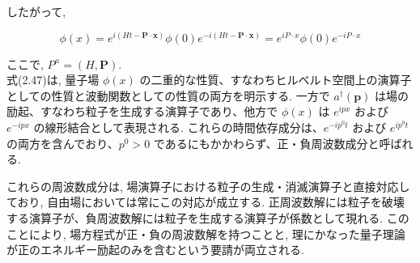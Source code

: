 \documentclass[a4paper,12pt]{article}
\begin{document}
したがって,

\begin{equation*}
\phi(x) = e^{i(Ht - \mathbf{P} \cdot \mathbf{x})} \phi(0) e^{-i(Ht - \mathbf{P} \cdot \mathbf{x})} = e^{i P \cdot x} \phi(0) e^{-i P \cdot x} \tag{2.49}
\end{equation*}

ここで, $P^\mu = (H, \mathbf{P})$.\\
式(2.47)は, 量子場 $\phi(x)$ の二重的な性質、すなわちヒルベルト空間上の演算子としての性質と波動関数としての性質の両方を明示する. 一方で $a^\dagger(\mathbf{p})$ は場の励起、すなわち粒子を生成する演算子であり、他方で $\phi(x)$ は $e^{ipx}$ および $e^{-ipx}$ の線形結合として表現される. これらの時間依存成分は、$e^{-i p^0 t}$ および $e^{i p^0 t}$ の両方を含んでおり、$p^0 > 0$ であるにもかかわらず、正・負周波数成分と呼ばれる.\par
これらの周波数成分は, 場演算子における粒子の生成・消滅演算子と直接対応しており, 自由場においては常にこの対応が成立する. 正周波数解には粒子を破壊する演算子が、負周波数解には粒子を生成する演算子が係数として現れる. このことにより, 場方程式が正・負の周波数解を持つことと, 理にかなった量子理論が正のエネルギー励起のみを含むという要請が両立される.
\end{document}

